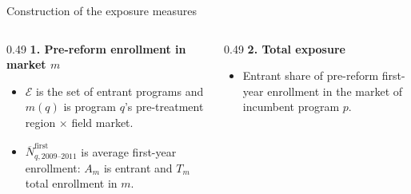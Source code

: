 \documentclass{beamer}
\begin{document}
\begin{frame}{Construction of the exposure measures}

\scriptsize
\setlength{\abovedisplayskip}{3pt}
\setlength{\belowdisplayskip}{3pt}

\begin{columns}[T,onlytextwidth]

\begin{column}{0.49\textwidth}
\textbf{1. Pre-reform enrollment in market $m$}

\begin{center}
\end{center}

\vspace{-0.1cm}

\begin{itemize}
\tiny
\setlength{\itemsep}{0pt}

\item $\mathcal E$ is the set of entrant programs and $m(q)$ is program
$q$'s pre-treatment region $\times$ field market.

\item $\overline{N}^{\mathrm{first}}_{q,2009\text{--}2011}$ is average
first-year enrollment: $A_m$ is entrant and $T_m$ total enrollment in $m$.

\end{itemize}
\end{column}

\begin{column}{0.49\textwidth}
\textbf{2. Total exposure}

\begin{center}
\end{center}

\vspace{-0.1cm}

\begin{itemize}
\tiny
\setlength{\itemsep}{0pt}

\item Entrant share of pre-reform first-year enrollment in the market of
incumbent program $p$.


\end{itemize}
\end{column}
\end{columns}
\end{frame}
\end{document}
